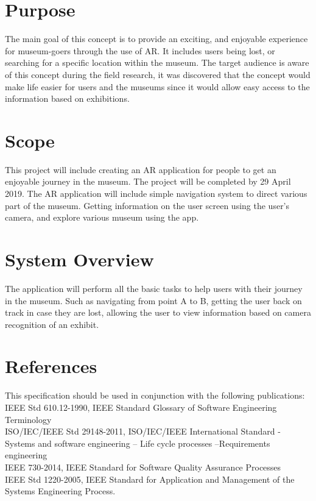 
\section{Purpose}
The main goal of this concept is to provide an exciting, and enjoyable experience for museum-goers through the use of AR. It includes users being lost, or searching for a specific location within the museum. The target audience is aware of this concept during the field research, it was discovered that the concept would make life easier for users and the museums since it would allow easy access to the information based on exhibitions.

\section{Scope}
This project will include creating an AR application for people to get an enjoyable journey in the museum. The project will be completed by 29 April 2019. The AR application will include simple navigation system to direct various part of the museum. Getting information on the user screen using the user's camera, and explore various museum using the app. 

\section{System Overview}
The application will perform all the basic tasks to help users with their journey in the museum. Such as navigating from point A to B, getting the user back on track in case they are lost, allowing the user to view information based on camera recognition of an exhibit.

\newpage
\section{References}
This specification should be used in conjunction with the following publications:\\
IEEE Std 610.12-1990, IEEE Standard Glossary of Software Engineering Terminology \cite{IEEE610}\\
ISO/IEC/IEEE Std 29148-2011, ISO/IEC/IEEE International Standard - Systems and software engineering -- Life cycle processes --Requirements engineering \cite{IEEE29148} \\
IEEE 730-2014, IEEE Standard for Software Quality Assurance Processes \cite{IEEE730} \\
IEEE Std 1220-2005, IEEE Standard for Application and Management of the Systems Engineering Process. \cite{IEEE1220}

